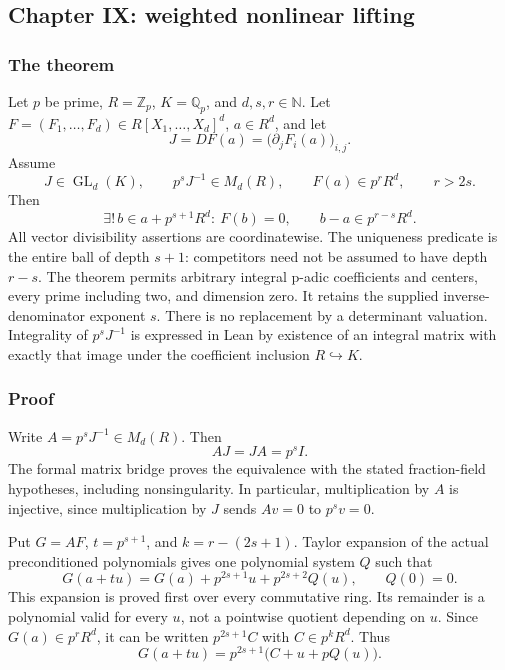 \hypertarget{cont6:paper-ix-weighted-nonlinear-lifting}{%
\subsection{Chapter IX: weighted nonlinear
lifting}\label{cont6:paper-ix-weighted-nonlinear-lifting}}

\hypertarget{cont6:the-theorem}{%
\subsubsection{The theorem}\label{cont6:the-theorem}}

Let \(p\) be prime, \(R=\mathbb Z_p\), \(K=\mathbb Q_p\), and
\(d,s,r\in\mathbb N\). Let
\(F=(F_1,\ldots,F_d)\in R[X_1,\ldots,X_d]^d\), \(a\in R^d\), and let \[
J=DF(a)=\bigl(\partial_jF_i(a)\bigr)_{i,j}.
\] Assume \[
J\in\operatorname{GL}_d(K),\qquad p^sJ^{-1}\in M_d(R),\qquad
F(a)\in p^rR^d,\qquad r>2s.
\] Then \[
\boxed{\exists!\,b\in a+p^{s+1}R^d:\ F(b)=0,}
\qquad
\boxed{b-a\in p^{r-s}R^d.}
\] All vector divisibility assertions are coordinatewise. The uniqueness
predicate is the entire ball of depth \(s+1\): competitors need not be
assumed to have depth \(r-s\). The theorem permits arbitrary integral
p-adic coefficients and centers, every prime including two, and
dimension zero. It retains the supplied inverse-denominator exponent
\(s\). There is no replacement by a determinant valuation. Integrality
of \(p^sJ^{-1}\) is expressed in Lean by existence of an integral matrix
with exactly that image under the coefficient inclusion
\(R\hookrightarrow K\).

\hypertarget{cont6:proof}{%
\subsubsection{Proof}\label{cont6:proof}}

Write \(A=p^sJ^{-1}\in M_d(R)\). Then \[
AJ=JA=p^sI.
\] The formal matrix bridge proves the equivalence with the stated
fraction-field hypotheses, including nonsingularity. In particular,
multiplication by \(A\) is injective, since multiplication by \(J\)
sends \(Av=0\) to \(p^sv=0\).

Put \(G=AF\), \(t=p^{s+1}\), and \(k=r-(2s+1)\). Taylor expansion of the
actual preconditioned polynomials gives one polynomial system \(Q\) such
that \[
G(a+tu)=G(a)+p^{2s+1}u+p^{2s+2}Q(u),\qquad Q(0)=0.
\] This expansion is proved first over every commutative ring. Its
remainder is a polynomial valid for every \(u\), not a pointwise
quotient depending on \(u\). Since \(G(a)\in p^rR^d\), it can be written
\(p^{2s+1}C\) with \(C\in p^kR^d\). Thus \[
G(a+tu)=p^{2s+1}\bigl(C+u+pQ(u)\bigr).
\]

